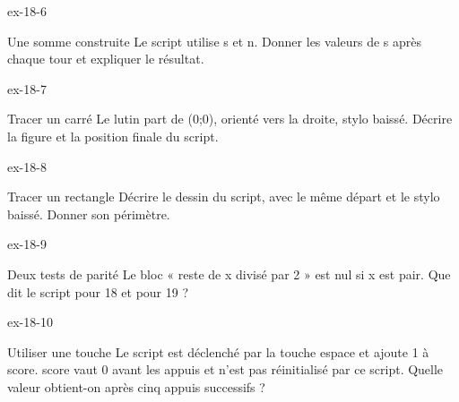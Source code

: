 \begin{blocLivre}{ex-18-6}\begin{exercice}[2]{Une somme construite}
Le script utilise s et n. Donner les valeurs de s après chaque tour et expliquer le résultat.
\label{fig-ex-18-6}
\end{exercice}\end{blocLivre}
\begin{blocLivre}{ex-18-7}\begin{exercice}[2]{Tracer un carré}
Le lutin part de (0;0), orienté vers la droite, stylo baissé. Décrire la figure et la position finale du script.
\label{fig-ex-18-7}
\end{exercice}\end{blocLivre}
\begin{blocLivre}{ex-18-8}\begin{exercice}[2]{Tracer un rectangle}
Décrire le dessin du script, avec le même départ et le stylo baissé. Donner son périmètre.
\label{fig-ex-18-8}
\end{exercice}\end{blocLivre}
\begin{blocLivre}{ex-18-9}\begin{exercice}[2]{Deux tests de parité}
Le bloc « reste de x divisé par 2 » est nul si x est pair. Que dit le script pour 18 et pour 19 ?
\label{fig-ex-18-9}
\end{exercice}\end{blocLivre}
\begin{blocLivre}{ex-18-10}\begin{exercice}[2]{Utiliser une touche}
Le script est déclenché par la touche espace et ajoute 1 à score. score vaut 0 avant les appuis et n’est pas réinitialisé par ce script. Quelle valeur obtient-on après cinq appuis successifs ?
\label{fig-ex-18-10}
\end{exercice}\end{blocLivre}

